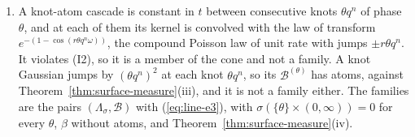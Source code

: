 \begin{theorem}
\begin{enumerate}
The extreme rays of the cone of the $\mathcal{B}$ are those of
$\mathcal{B}^{(\theta)} := \sum_n(\theta q^n)^2\delta_{\theta q^n}$, the \emph{knot Gaussians}
$a(t) = \sum_{n :\ \theta q^n \le t}(\theta q^n)^2$.
\item A knot-atom cascade is constant in $t$ between consecutive knots $\theta q^n$ of phase
$\theta$, and at each of them its kernel is convolved with the law of transform
$e^{-(1 - \cos(r\theta q^n\omega))}$, the compound Poisson law of unit rate with jumps
$\pm r\theta q^n$. It violates (I2), so it is a member of the cone and not a family. A knot
Gaussian jumps by $(\theta q^n)^2$ at each knot $\theta q^n$, so its $\mathcal{B}^{(\theta)}$ has
atoms, against Theorem~\ref{thm:surface-measure}(iii), and it is not a family either. The families
are the pairs $(\Lambda_\sigma, \mathcal{B})$ with (\ref{eq:line-e3}), with $\sigma(\{\theta\} \times (0,\infty)) = 0$
for every $\theta$, $\beta$ without atoms, and Theorem~\ref{thm:surface-measure}(iv).
\end{enumerate}
\end{theorem}


